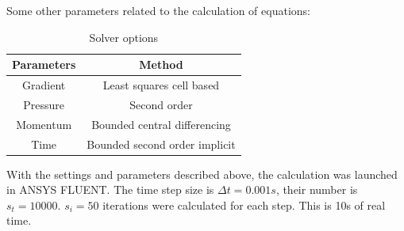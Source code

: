 	Some other parameters related to the calculation of equations:
	\begin{table}[H]
		\begin{center}
			\begin{tabular}{|c|c|}
				\hline
				Parameters & Method\\
				\hline
				Gradient & Least squares cell based\\
				\hline
				Pressure & Second order\\
				\hline
				Momentum & Bounded central differencing\\
				\hline
				Time & Bounded second order implicit\\
				\hline
			\end{tabular}
		\end{center}
		\caption{\footnotesize{Solver options}}
	\end{table}
	With the settings and parameters described above, the calculation was launched in ANSYS FLUENT. The time step size is $\Delta t = 0.001 s$, their number is $s_t = 10000$. $s_i = 50$ iterations were calculated for each step. This is 10s of real time.